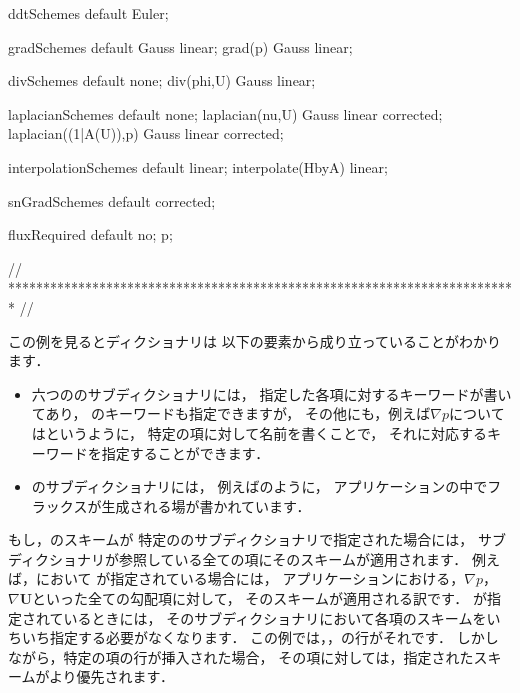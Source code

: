 \begin{OFverbatim}[file, linenum=17]

ddtSchemes
{
    default         Euler;
}

gradSchemes
{
    default         Gauss linear;
    grad(p)         Gauss linear;
}

divSchemes
{
    default         none;
    div(phi,U)      Gauss linear;
}

laplacianSchemes
{
    default         none;
    laplacian(nu,U) Gauss linear corrected;
    laplacian((1|A(U)),p) Gauss linear corrected;
}

interpolationSchemes
{
    default         linear;
    interpolate(HbyA) linear;
}

snGradSchemes
{
    default         corrected;
}

fluxRequired
{
    default         no;
    p;
}


// ************************************************************************* //
\end{OFverbatim}
この例を見るとディクショナリは
以下の要素から成り立っていることがわかります．
\begin{itemize}
 \item 六つののサブディクショナリには，
       指定した各項に対するキーワードが書いてあり，
       のキーワードも指定できますが，
       その他にも，例えば$\nabla p$についてはというように，
       特定の項に対して名前を書くことで，
       それに対応するキーワードを指定することができます．
 \item {}のサブディクショナリには，
       例えばのように，
       アプリケーションの中でフラックスが生成される場が書かれています．
\end{itemize}
もし，のスキームが
特定ののサブディクショナリで指定された場合には，
サブディクショナリが参照している全ての項にそのスキームが適用されます．
例えば，において
が指定されている場合には，
アプリケーションにおける，$\nabla p$，$\nabla\bm{U}$といった全ての勾配項に対して，
そのスキームが適用される訳です．
が指定されているときには，
そのサブディクショナリにおいて各項のスキームをいちいち指定する必要がなくなります．
この例では，，の行がそれです．
しかしながら，特定の項の行が挿入された場合，
その項に対しては，指定されたスキームがより優先されます．

